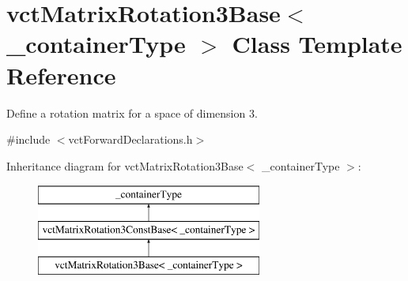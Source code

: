 \hypertarget{classvct_matrix_rotation3_base}{\section{vct\-Matrix\-Rotation3\-Base$<$ \-\_\-container\-Type $>$ Class Template Reference}
\label{classvct_matrix_rotation3_base}
}


Define a rotation matrix for a space of dimension 3.  




{\ttfamily \#include $<$vct\-Forward\-Declarations.\-h$>$}

Inheritance diagram for vct\-Matrix\-Rotation3\-Base$<$ \-\_\-container\-Type $>$\-:\begin{figure}[H]
\begin{center}
\leavevmode
\includegraphics[height=3.000000cm]{d1/d91/classvct_matrix_rotation3_base}
\end{center}
\end{figure}
